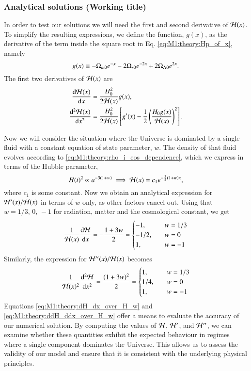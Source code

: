 \subsubsection{Analytical solutions (Working title)} \label{subsec:M1:theory:analytical_solutions}
In order to test our solutions we will need the first and second derivative of $\mathcal{H}(x)$. To simplify the resulting expressions, we define the function, $g(x)$, as the derivative of the term inside the square root in Eq. \eqref{eq:M1:theory:Hp_of_x}, namely 
\begin{equation}
    g(x) \equiv -\Omega_{m0} e^{-x} -2\Omega_{r0} e^{-2x} + 2\Omega_{\Lambda 0} e^{2x}. \label{eq:M1:theory:g_of_x} 
\end{equation} 
%
The first two derivatives of $\mathcal{H}(x)$ are   
\begin{align} 
    \dv{\mathcal{H}(x)}{x} &= \frac{H_0^2}{2\mathcal{H}(x)}g(x), \label{eq:M1:theory:dHp_dx} \\
    \dv[2]{\mathcal{H}(x)}{x} &= \frac{H_0^2}{2\mathcal{H}(x)}\left[ g'(x) - \frac{1}{2}\left( \frac{H_0 g(x)}{\mathcal{H}(x)} \right)^2 \right]. \label{eq:M1:theory:ddHp_ddx}
\end{align}
%

Now we will consider the situation where the Universe is dominated by a single fluid with a constant equation of state parameter, $w$. The density of that fluid evolves according to \eqref{eq:M1:theory:rho_i_eos_dependence}, which we express in terms of the Hubble parameter, 
\begin{equation}
    H(t)^2 \propto a^{-3(1+w)}\implies \mathcal{H}(x) = c_1 e^{-\frac{3}{2}(1+w)x}, \label{eq:M1:theory:Hx_eos_wi}
\end{equation}
where $c_1$ is some constant. Now we obtain an analytical expression for $\mathcal{H}'(x)/\mathcal{H}(x)$ in terms of $w$ only, as other factors cancel out. Using that $w=1/3,\,0,\,-1$ for radiation, matter and the cosmological constant, we get   
\begin{equation} \label{eq:M1:theory:dH_dx_over_H_w}
    \frac{1}{\mathcal{H}(x)}\dv{\mathcal{H}}{x} = - \frac{1+3w}{2} = 
    \begin{cases}
        -1,\quad & w=1/3 \\ 
        -1/2, \quad & w=0 \\ 
        1, \quad & w=-1
    \end{cases} 
\end{equation}  
%
Similarly, the expression for $\mathcal{H}''(x)/\mathcal{H}(x)$ becomes  
\begin{equation} \label{eq:M1:theory:ddH_ddx_over_H_w}
    \frac{1}{\mathcal{H}(x)^2}\dv[2]{\mathcal{H}}{x} = \frac{(1+3w)^2}{2} = 
    \begin{cases}
        1,\quad & w=1/3 \\ 
        1/4,\quad & w=0 \\ 
        1,\quad & w=-1 
    \end{cases}
\end{equation}
%  
Equations \eqref{eq:M1:theory:dH_dx_over_H_w} and \eqref{eq:M1:theory:ddH_ddx_over_H_w} offer a means to evaluate the accuracy of our numerical solution. By computing the values of $\mathcal{H}$, $\mathcal{H}'$, and $\mathcal{H}''$, we can examine whether these quantities exhibit the expected behaviour in regimes where a single component dominates the Universe. This allows us to assess the validity of our model and ensure that it is consistent with the underlying physical principles.